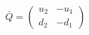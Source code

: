 \begin{equation}
\bar{Q}= \left(
\begin{array}{cc}
u_2 & -u_1 \\
d_2 & -d_1 
\end{array}  \right)
\end{equation}

